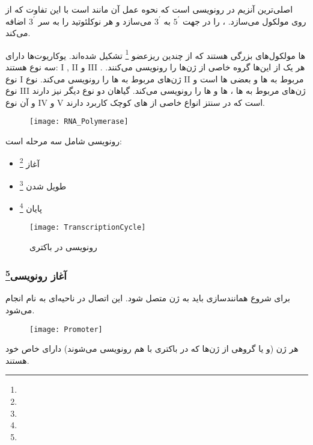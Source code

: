 اصلی‌ترین آنزیم در رونویسی
است که نحوه عمل آن مانند
است با این تفاوت که
از روی
مولکول
می‌سازد.
،
را در جهت
$ 5^\prime $
به
$ 3^\prime $
می‌سازد و هر نوکلئوتید را به سر
$ 3^\prime $
اضافه می‌کند.

ها مولکول‌های بزرگی هستند که از چندین ریزعضو
\footnote{}
تشکیل شده‌اند. یوکاریوت‌ها دارای سه نوع
هستند:
\RN{1}
,
\RN{2}
و
\RN{3}
.
هر یک از این‌ها گروه خاصی از ژن‌ها را رونویسی می‌کنند.
نوع
\RN{1}
ژن‌های مربوط به
ها را رونویسی می‌کند.
نوع
\RN{2}
مربوط به
ها و بعضی
ها است و نوع
\RN{3}
ژن‌های مربوط به
ها
،
ها و
ها را رونویسی می‌کند.
گیاهان دو نوع
دیگر نیز دارند و آن نوع
\RN{4}
و
\RN{5}
است که در سنتز
انواع خاصی از
های کوچک کاربرد دارند.
\cite{StagesOfTranscription}

\begin{figure}[htbp]
\centering
\texttt{[image: RNA\_Polymerase]}
\end{figure}

\pagebreak
\noindent
رونویسی شامل سه مرحله است:
\begin{itemize}
\item آغاز
\footnote{}
\item طویل شدن
\footnote{}
\item پایان
\footnote{}
\end{itemize}

\begin{figure}[htbp]
\centering
\texttt{[image: TranscriptionCycle]}
\caption{رونویسی در باکتری}
\end{figure}

\pagebreak
\subsubsection{آغاز رونویسی\protect\footnote{}}
برای شروع همانندسازی
باید به ژن متصل شود. این اتصال در ناحیه‌ای به نام
انجام می‌شود.

\begin{figure}[htbp]
\centering
\texttt{[image: Promoter]}
\end{figure}

\noindent
هر ژن (و یا گروهی از ژن‌ها که در باکتری با هم رونویسی می‌شوند)
\cite{StagesOfTranscription}
دارای
خاص خود هستند.

